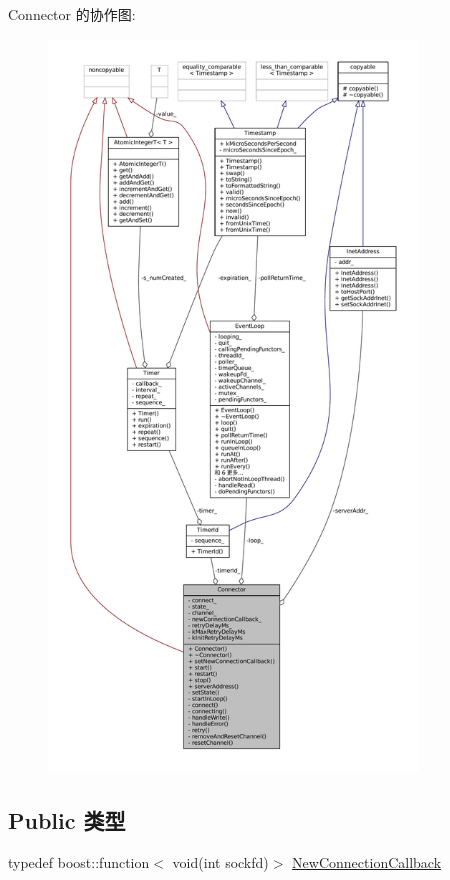 Connector 的协作图\+:
\nopagebreak
\begin{figure}[H]
\begin{center}
\leavevmode
\includegraphics[height=550pt]{classmuduo_1_1Connector__coll__graph}
\end{center}
\end{figure}
\subsection*{Public 类型}
\begin{DoxyCompactItemize}
\item 
typedef boost\+::function$<$ void(int sockfd)$>$ \hyperlink{classmuduo_1_1Connector_a74d0c9e28e41cb2b3310e0c1d3671710}{New\+Connection\+Callback}
\end{DoxyCompactItemize}
